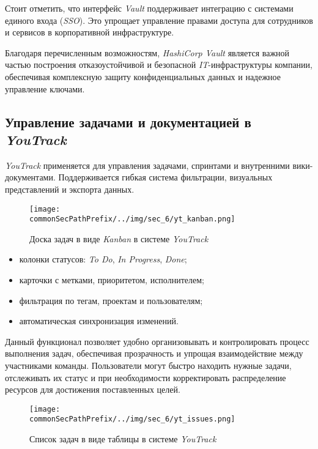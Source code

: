 Стоит отметить, что интерфейс \textit{Vault} поддерживает интеграцию с системами единого входа (\textit{SSO}). Это упрощает управление правами доступа для сотрудников и сервисов в корпоративной инфраструктуре.

Благодаря перечисленным возможностям, \textit{HashiCorp Vault} является важной частью построения отказоустойчивой и безопасной \textit{IT}-инфраструктуры компании, обеспечивая комплексную защиту конфиденциальных данных и надежное управление ключами.

\subsection{Управление задачами и документацией в \textit{YouTrack}}

\textit{YouTrack}\cite{youtrack} применяется для управления задачами, спринтами и внутренними вики-документами. Поддерживается гибкая система фильтрации, визуальных представлений и экспорта данных.

\begin{figure}[ht]
    \centering
    \texttt{[image: \\commonSecPathPrefix/../img/sec\_6/yt\_kanban.png]}
    \caption{Доска задач в виде \textit{Kanban} в системе \textit{YouTrack}}
    \label{fig:user_guide:yt_kanban}
\end{figure}

\begin{itemize}
    \item колонки статусов: \textit{To Do}, \textit{In Progress}, \textit{Done};
    \item карточки с метками, приоритетом, исполнителем;
    \item фильтрация по тегам, проектам и пользователям;
    \item автоматическая синхронизация изменений.
\end{itemize}

Данный функционал позволяет удобно организовывать и контролировать процесс выполнения задач, обеспечивая прозрачность и упрощая взаимодействие между участниками команды. Пользователи могут быстро находить нужные задачи, отслеживать их статус и при необходимости корректировать распределение ресурсов для достижения поставленных целей.

\begin{figure}[ht]
    \centering
    \texttt{[image: \\commonSecPathPrefix/../img/sec\_6/yt\_issues.png]}
    \caption{Список задач в виде таблицы в системе \textit{YouTrack}}
    \label{fig:user_guide:yt_issues}
\end{figure}

